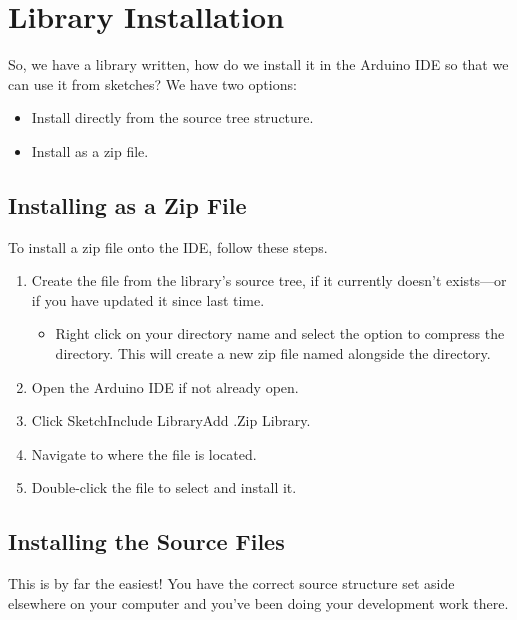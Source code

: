 \section{Library Installation}

So, we have a library written, how do we install it in the Arduino IDE so that we can use it from sketches? We have two options:

\begin{itemize}
    \item Install directly from the source tree structure.
    \item Install as a zip file.
\end{itemize}

\subsection{Installing as a Zip File}

To install a zip file onto the IDE, follow these steps.

\begin{enumerate}
    \item Create the  file from the library's source tree, if it currently doesn't exists---or if you have updated it since last time.
    \begin{itemize}
         \item Right click on your  directory name and select the option to compress the directory. This will create a new zip file named  alongside the  directory.
    \end{itemize}
    \item Open the Arduino IDE if not already open.
    \item Click Sketch\lyxarrow{}Include Library\lyxarrow{}Add .Zip Library.
    \item Navigate to where the  file is located.
    \item Double-click the  file to select and install it.
\end{enumerate}


\subsection{Installing the Source Files}

This is by far the easiest! You have the correct source structure set aside elsewhere on your computer and you've been doing your development work there.

